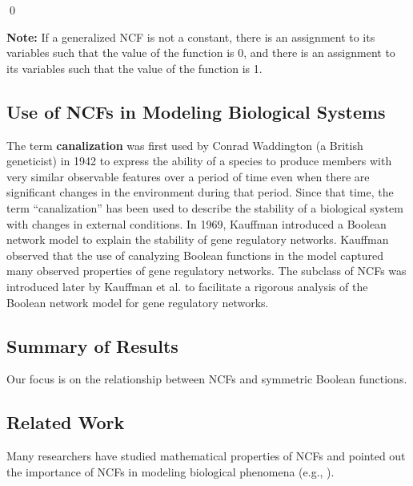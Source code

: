 \noindent
\qed

\bigskip

\noindent
\textbf{Note:} If a generalized NCF is not a constant, 
there is an assignment to its variables
such that the value of the function is 0,
and there is an assignment to its variables
such that the value of the function is 1.
\fi


\subsection{Use of NCFs in Modeling Biological Systems}

The term \textbf{canalization} was first used by
Conrad Waddington (a British geneticist)
in 1942 \cite{Waddington-1942}
to express the ability of a species
to produce members with very similar observable features over a period
of time even when there are significant changes in the environment
during that period.
Since that time, the term ``canalization'' has been used to describe
the stability of a biological system with changes
in external conditions.
In 1969, Kauffman \cite{Kauffman-1969} introduced a Boolean network model
to explain the stability of gene regulatory networks.
Kauffman observed that the use of canalyzing Boolean
functions in the model captured many observed properties of
gene regulatory networks.
The subclass of NCFs was
introduced later by Kauffman et al. \cite{Kauffman-etal-2003} 
to facilitate a rigorous analysis of the Boolean network model
for gene regulatory networks.



\subsection{Summary of Results}
\label{sse:contrib}

Our focus is on the relationship between NCFs and symmetric
Boolean functions.


\subsection{Related Work}


Many researchers have studied mathematical properties of NCFs and
pointed out the importance of NCFs in modeling biological
phenomena (e.g., \cite{Kauffman-etal-2003,Kauffman-etal-2004,Layne-2011,
Layne-etal-2012,Li-etal-2011,Li-etal-2012,Li-etal-2013}).

\medskip

